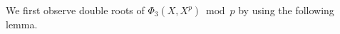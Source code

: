 \documentclass[a4paper, 11pt]{article}
\theoremstyle{plain}
\newtheorem{lem}[defn]{Lemma}
\newcommand{\?}{\textcolor{red}{??}}
\begin{document}

We first observe double roots of $\Phi_3(X, X^p) \bmod p$ by using the following lemma.
\end{document}
